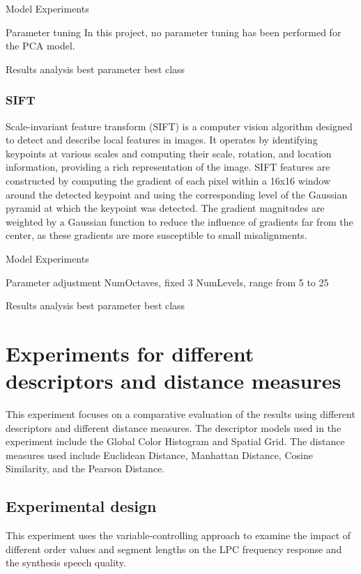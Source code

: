 \documentclass{article}
\begin{document}
Model Experiments

Parameter tuning
In this project, no parameter tuning has been performed for the PCA model.

Results analysis
best parameter
best class



\subsubsection{SIFT}

Scale-invariant feature transform (SIFT) is a computer vision algorithm designed to detect and describe local features in images. It operates by identifying keypoints at various scales and computing their scale, rotation, and location information, providing a rich representation of the image. SIFT features are constructed by computing the gradient of each pixel within a 16x16 window around the detected keypoint and using the corresponding level of the Gaussian pyramid at which the keypoint was detected. The gradient magnitudes are weighted by a Gaussian function to reduce the influence of gradients far from the center, as these gradients are more susceptible to small misalignments.

Model Experiments

Parameter adjustment
NumOctaves, fixed 3 
NumLevels, range from 5 to 25

Results analysis
best parameter
best class






\section{Experiments for different descriptors and distance measures}

This experiment focuses on a comparative evaluation of the results using different descriptors and different distance measures. The descriptor models used in the experiment include the Global Color Histogram and Spatial Grid. The distance measures used include Euclidean Distance, Manhattan Distance, Cosine Similarity, and the Pearson Distance.

\subsection{Experimental design}

This experiment uses the variable-controlling approach to examine the impact of different order values and segment lengths on the LPC frequency response and the synthesis speech quality.
\end{document}

